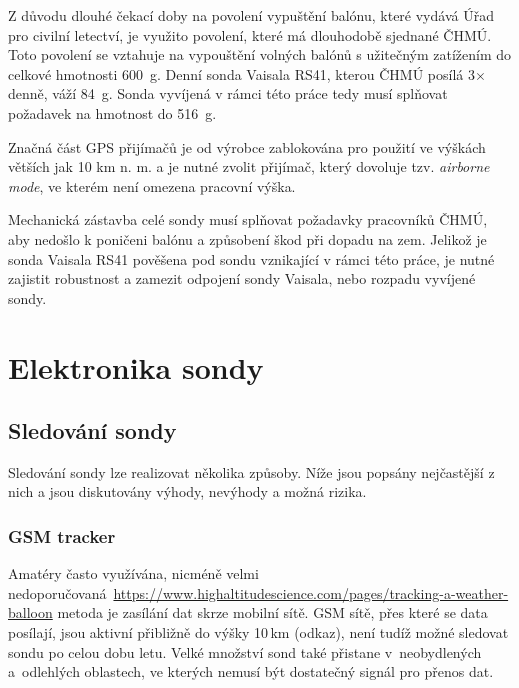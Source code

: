 \documentclass[twoside]{ctuthesis}
\theoremstyle{plain}
\theoremstyle{definition}
\theoremstyle{note}
\begin{document}
	Z důvodu dlouhé čekací doby na povolení vypuštění balónu, které vydává Úřad pro civilní letectví, je využito povolení, které má dlouhodobě sjednané ČHMÚ. Toto povolení se vztahuje na vypouštění volných balónů s užitečným zatížením do celkové hmotnosti 600~g. Denní sonda Vaisala RS41, kterou ČHMÚ posílá 3$\times$ denně, váží 84~g. Sonda vyvíjená v rámci této práce tedy musí splňovat požadavek na hmotnost do 516~g.

	Značná část GPS přijímačů je od výrobce zablokována pro použití ve výškách větších jak 10 km n. m. a je nutné zvolit přijímač, který dovoluje tzv. \textit{airborne mode}, ve kterém není omezena pracovní výška.

	Mechanická zástavba celé sondy musí splňovat požadavky pracovníků ČHMÚ, aby nedošlo k poničeni balónu a způsobení škod při dopadu na zem. Jelikož je sonda Vaisala RS41 pověšena pod sondu vznikající v rámci této práce, je nutné zajistit robustnost a zamezit odpojení sondy Vaisala, nebo rozpadu vyvíjené sondy.


	
	\section{Elektronika sondy}
	
	
		\subsection{Sledování sondy}
		Sledování sondy lze realizovat několika způsoby. Níže jsou popsány nejčastější z nich a jsou diskutovány výhody, nevýhody a možná rizika.

			\subsubsection{GSM tracker}
			Amatéry často využívána, nicméně velmi nedoporučovaná~\url{https://www.highaltitudescience.com/pages/tracking-a-weather-balloon} metoda je zasílání dat skrze mobilní sítě. GSM sítě, přes které se data posílají, jsou aktivní přibližně do výšky 10\,km (odkaz), není tudíž možné sledovat sondu po celou dobu letu. Velké množství sond také přistane v~neobydlených a~odlehlých oblastech, ve kterých nemusí být dostatečný signál pro přenos dat.
\end{document}
